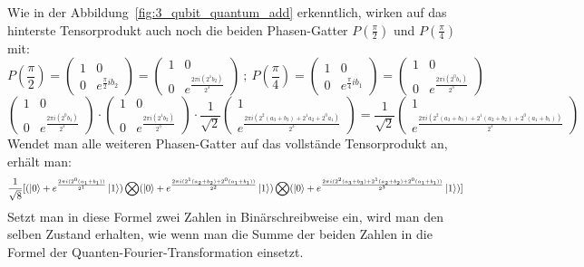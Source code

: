 Wie in der Abbildung~\ref*{fig:3_qubit_quantum_add} erkenntlich,
wirken auf das hinterste Tensorprodukt auch noch die beiden Phasen-Gatter \(P(\frac{\pi}{2})\) und \(P(\frac{\pi}{4})\) mit:
\[
    P(\frac{\pi}{2}) = 
\begin{pmatrix}
    1 & 0 \\
    0 & e^{\frac{\pi}{2} i b_2}
  \end{pmatrix}
  =
  \begin{pmatrix}
    1 & 0 \\
    0 & e^{\frac{2\pi i (2^1b_2)}{2^3}}
  \end{pmatrix}
  ~;~
P(\frac{\pi}{4}) = 
\begin{pmatrix}
    1 & 0 \\
    0 & e^{\frac{\pi}{4} i b_1}
  \end{pmatrix}
  =
  \begin{pmatrix}
    1 & 0 \\
    0 & e^{\frac{2\pi i (2^0b_1)}{2^3}}
  \end{pmatrix}
\]
\[
    \begin{pmatrix}
        1 & 0 \\
        0 & e^{\frac{2\pi i (2^0b_1)}{2^3}}
      \end{pmatrix}
      \cdot
      \begin{pmatrix}
        1 & 0 \\
        0 & e^{\frac{2\pi i (2^1b_2)}{2^3}}
      \end{pmatrix}
      \cdot
      \frac{1}{\sqrt{2}}
      \begin{pmatrix}
        1  \\
         e^{\frac{2 \pi i (2^{2}(a_3+b_3) +2^1a_2+2^0a_1)}{2^3}}
      \end{pmatrix}
      =
      \frac{1}{\sqrt{2}}
      \begin{pmatrix}
        1  \\
         e^{\frac{2 \pi i (2^{2}(a_3+b_3) +2^1(a_2+b_2)+2^0(a_1+b_1))}{2^3}}
      \end{pmatrix}
\]
Wendet man alle weiteren Phasen-Gatter auf das vollstände Tensorprodukt an, 
erhält man:
\[
    \frac{1}{\sqrt{8}} [ (\ket{0} + { e^{\frac{2 \pi i (2^0(a_1+b_1))}{2^1}}}\ket{1} ) \bigotimes
( \ket{0} + { e^{\frac{2 \pi i (2^1(a_2+b_2)+2^0(a_1+b_1))}{2^2}}}\ket{1} ) \bigotimes
( \ket{0} + { e^{\frac{2 \pi i (2^{2}(a_3+b_3) +2^1(a_2+b_2)+2^0(a_1+b_1))}{2^3}}}\ket{1} ) ]
\]
Setzt man in diese Formel zwei Zahlen in Binärschreibweise ein, 
wird man den selben Zustand erhalten,
wie wenn man die Summe der beiden Zahlen in die Formel der Quanten-Fourier-Transformation einsetzt.
